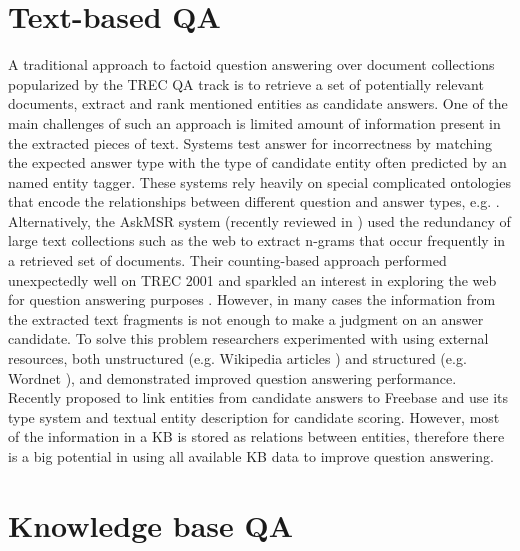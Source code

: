 \section{Text-based QA}

A traditional approach to factoid question answering over document collections popularized by the TREC QA track is to retrieve a set of potentially relevant documents, extract and rank mentioned entities as candidate answers.
One of the main challenges of such an approach is limited amount of information present in the extracted pieces of text.
Systems test answer for incorrectness by matching the expected answer type with the type of candidate entity often predicted by an named entity tagger.
These systems rely heavily on special complicated ontologies that encode the relationships between different question and answer types, e.g. \cite{hovy2000question,LiRoth02, prager2006question}.
Alternatively, the AskMSR system \cite{brill_askmsr} (recently reviewed in \cite{tsai2015web}) used the redundancy of large text collections such as the web to extract n-grams that occur frequently in a retrieved set of documents.
Their counting-based approach performed unexpectedly well on TREC 2001 and sparkled an interest in exploring the web for question answering purposes \cite{LinK03}.
However, in many cases the information from the extracted text fragments is not enough to make a judgment on an answer candidate.
To solve this problem researchers experimented with using external resources, both unstructured (e.g. Wikipedia articles  \cite{ahn2005using, buscaldi2006mining}) and structured (e.g. Wordnet \cite{pasca2001informative}), and demonstrated improved question answering performance.
Recently \cite{Sun:2015:ODQ:2736277.2741651} proposed to link entities from candidate answers to Freebase and use its type system and textual entity description for candidate scoring.
However, most of the information in a KB is stored as relations between entities, therefore there is a big potential in using all available KB data to improve question answering.

\section{Knowledge base QA}

